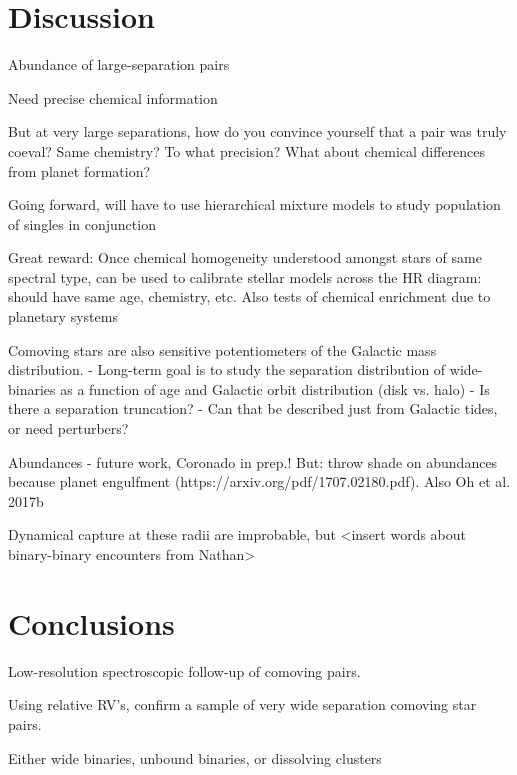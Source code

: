 \documentclass[modern, letterpaper]{aastex61}
\begin{document}
\section{Discussion} \label{sec:discussion}

Abundance of large-separation pairs

Need precise chemical information

But at very large separations, how do you convince yourself that a pair was truly coeval? Same chemistry? To what precision? What about chemical differences from planet formation?

Going forward, will have to use hierarchical mixture models to study population of singles in conjunction

Great reward: Once chemical homogeneity understood amongst stars of same spectral type, can be used to calibrate stellar models across the HR diagram: should have same age, chemistry, etc. Also tests of chemical enrichment due to planetary systems

Comoving stars are also sensitive potentiometers of the Galactic mass
distribution.
- Long-term goal is to study the separation distribution of wide-binaries as a
  function of age and Galactic orbit distribution (disk vs. halo)
    - Is there a separation truncation?
    - Can that be described just from Galactic tides, or need perturbers?



Abundances - future work, Coronado in prep.! But: throw shade on abundances
because planet engulfment (https://arxiv.org/pdf/1707.02180.pdf). Also Oh et al.
2017b

Dynamical capture at these radii are improbable, but <insert words about binary-binary encounters from Nathan>

\section{Conclusions}

Low-resolution spectroscopic follow-up of comoving pairs.

Using relative RV's, confirm a sample of very wide separation comoving star pairs.

Either wide binaries, unbound binaries, or dissolving clusters
\end{document}
